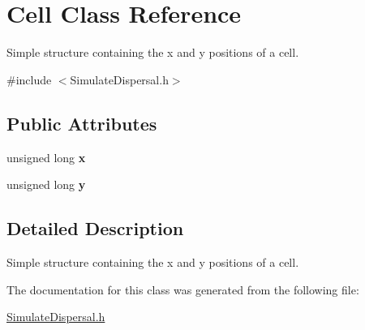 \hypertarget{struct_cell}{}\section{Cell Class Reference}
\label{struct_cell}


Simple structure containing the x and y positions of a cell.  




{\ttfamily \#include $<$Simulate\+Dispersal.\+h$>$}

\subsection*{Public Attributes}
\begin{DoxyCompactItemize}
\item 
unsigned long {\bfseries x}\hypertarget{struct_cell_ae3447db367c6914139088bc9f0bc7b26}{}\label{struct_cell_ae3447db367c6914139088bc9f0bc7b26}

\item 
unsigned long {\bfseries y}\hypertarget{struct_cell_aa99f74f738eba2c5106bb4e7b1bfa038}{}\label{struct_cell_aa99f74f738eba2c5106bb4e7b1bfa038}

\end{DoxyCompactItemize}


\subsection{Detailed Description}
Simple structure containing the x and y positions of a cell. 

The documentation for this class was generated from the following file\+:\begin{DoxyCompactItemize}
\item 
\hyperlink{_simulate_dispersal_8h}{Simulate\+Dispersal.\+h}\end{DoxyCompactItemize}
